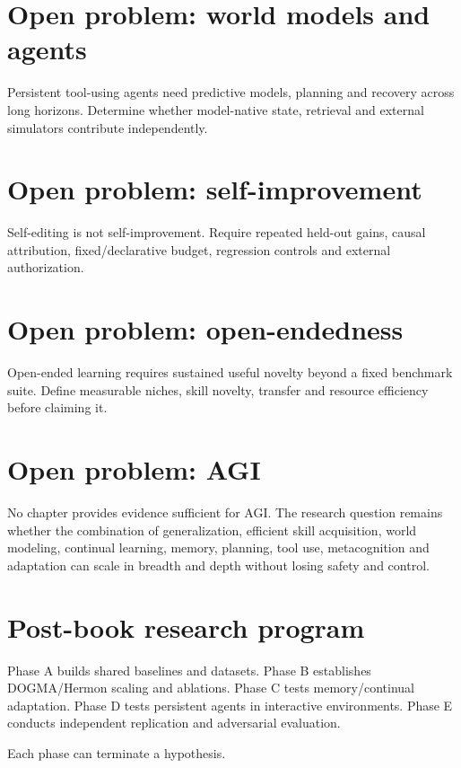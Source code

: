 \section{Open problem: world models and agents}
Persistent tool-using agents need predictive models, planning and recovery across long horizons. Determine whether model-native state, retrieval and external simulators contribute independently.

\section{Open problem: self-improvement}
Self-editing is not self-improvement. Require repeated held-out gains, causal attribution, fixed/declarative budget, regression controls and external authorization.

\section{Open problem: open-endedness}
Open-ended learning requires sustained useful novelty beyond a fixed benchmark suite. Define measurable niches, skill novelty, transfer and resource efficiency before claiming it.

\section{Open problem: AGI}
No chapter provides evidence sufficient for AGI. The research question remains whether the combination of generalization, efficient skill acquisition, world modeling, continual learning, memory, planning, tool use, metacognition and adaptation can scale in breadth and depth without losing safety and control.

\section{Post-book research program}
Phase A builds shared baselines and datasets. Phase B establishes DOGMA/Hermon scaling and ablations. Phase C tests memory/continual adaptation. Phase D tests persistent agents in interactive environments. Phase E conducts independent replication and adversarial evaluation.

Each phase can terminate a hypothesis.

